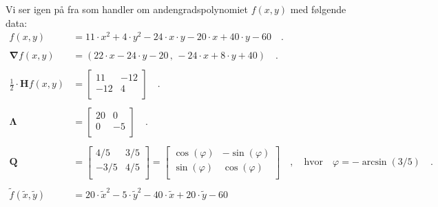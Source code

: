 \begin{example}[Hyperbel] \label{exampHyp02}
Vi ser igen  på  fra   som handler om andengradspolynomiet $f(x,y)$ med følgende data:
\begin{equation}
\begin{aligned}
f(x,y) &= 11\cdot x^{2} + 4\cdot y^{2} - 24\cdot x\cdot y - 20\cdot x + 40\cdot y - 60 \quad . \\   \\
\bm{\nabla}f(x,y) &= (22\cdot x - 24 \cdot y - 20\, , \, -24\cdot x + 8\cdot y + 40) \quad . \\  \\
\frac{1}{2}\cdot \mathbf{H}f(x,y) &= \left[
               \begin{array}{cc}
                 11 & -12 \\
                 -12 & 4 \\
               \end{array}
             \right] \quad . \\  \\
\bm{\Lambda} &= \left[
                     \begin{array}{cc}
                       20 & 0 \\
                       0 & -5 \\
                     \end{array}
                   \right] \quad . \\  \\
\mathbf{Q}&= \left[
              \begin{array}{cc}
                4/5 & 3/5 \\
                -3/5 & 4/5 \\
              \end{array}
            \right]  = \left[
                         \begin{array}{cc}
                           \cos(\varphi) & - \sin(\varphi) \\
                           \sin(\varphi) & \cos(\varphi) \\
                         \end{array}
                       \right] \quad , \quad  \textrm{hvor}\quad \varphi = -\arcsin(3/5) \quad . \\   \\
\widetilde{f}(\widetilde{x}, \widetilde{y}) & = 20\cdot  \widetilde{x}^{2} - 5\cdot \widetilde{y}^{2}-40 \cdot \widetilde{x} + 20\cdot \widetilde{y} -60\\

\end{aligned}
\end{equation}
\end{example}
